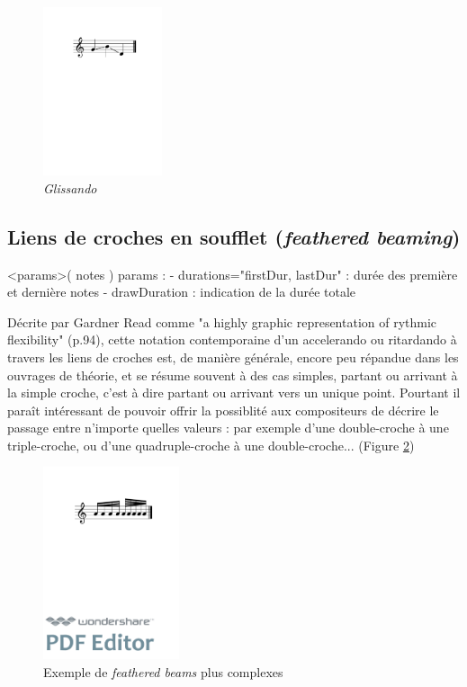 \documentclass{article}
\newenvironment{gmncode}	{\vspace{-2mm}\small\verbatim}{\endverbatim\vspace{-2mm}}
\begin{document}
\begin{figure}[h]
\centering

\begin{gmncode}
  [ \glissando( g b d ) ]
\end{gmncode}

\includegraphics[width=35mm]{img/glissando1.pdf}
\caption{\emph{Glissando}}
\label{fig:glissandoSimple}
\end{figure}




\subsection{Liens de croches en soufflet (\emph{feathered beaming})}\label{subsec:featheredBeaming}
\bigskip

\begin{gmncode}
  \fBeam<params>( notes )
  params : 
    - durations="firstDur, lastDur" : 
      durée des première et dernière notes
    - drawDuration : 
      indication de la durée totale

\end{gmncode}

Décrite par Gardner Read comme "a highly graphic representation of rythmic flexibility"  \cite{read1969music} (p.94), cette notation contemporaine d'un accelerando ou ritardando à travers les liens de croches est, de manière générale, encore peu répandue dans les ouvrages de théorie, et se résume souvent à des cas simples, partant ou arrivant à la simple croche, c'est à dire partant ou arrivant vers un unique point. Pourtant il paraît intéressant de pouvoir offrir la possiblité aux compositeurs de décrire le passage entre n'importe quelles valeurs : par exemple d'une double-croche à une triple-croche, ou d'une quadruple-croche à une double-croche... (Figure \ref{fig:fbeamcomplex})

\begin{figure}[h]
\centering
\includegraphics[width=40mm]{img/fbeamcomplex.pdf}
\caption{Exemple de \emph{feathered beams} plus complexes}
\label{fig:fbeamcomplex}
\end{figure}
\end{document}
